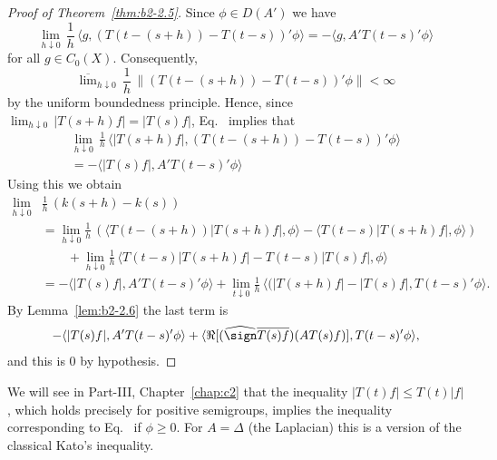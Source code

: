 \begin{proof}[Proof of Theorem~\ref{thm:b2-2.5}]
Since $\phi \in D(A')$ we have
\begin{equation}\label{eq:b2-2.14}
\lim_{h \downarrow 0}\, \frac{1}{h}\, \langle g,(T(t-(s+h)) - T(t-s))'\phi \rangle = - \langle g,A'T(t-s)'\phi \rangle
\end{equation}
for all $g \in C_{0}(X)$.
Consequently,
\begin{equation*}
\overline{\lim}_{h \downarrow 0}\, \frac{1}{h}\, \|(T(t-(s+h)) - T(t-s))'\phi\| < \infty
\end{equation*}
by the uniform boundedness principle.
Hence, since $\lim_{h \downarrow 0}\, |T(s+h)f| = |T(s)f|$, Eq.~ implies that
\begin{equation}\label{eq:b2-2.15}
\begin{split}
\lim_{h \downarrow 0}\, \frac{1}{h}\, \langle |T(s+h)f|,(T(t-(s+h)) - T(t-s))'\phi \rangle \\
= - \langle |T(s)f|,A'T(t-s)'\phi \rangle
\end{split}
\end{equation}
Using this we obtain
\begin{align*}
\lim_{h \downarrow 0} & \frac{1}{h}\, (k(s+h) - k(s)) \\
&= \lim_{h \downarrow 0}  \frac{1}{h}\, (\langle T(t-(s+h))|T(s+h)f|,\phi \rangle - \langle T(t-s)|T(s+h)f|,\phi \rangle) \\
&\qquad + \lim_{h \downarrow 0}  \frac{1}{h}\, \langle T(t-s)|T(s+h)f| - T(t-s)|T(s)f|,\phi \rangle \\
&= -\langle |T(s)f|,A'T(t-s)'\phi \rangle + \lim_{t \downarrow 0}  \frac{1}{h} \, \langle (|T(s+h)f| -  |T(s)f| , T(t-s)'\phi \rangle .
\end{align*}
By Lemma~\ref{lem:b2-2.6} the last term is
\begin{align*}
- \langle |T(s)f|,A'T(t-s)'\phi \rangle + \langle \Re[(\widehat{\sign} \overline{T(s)f})(AT(s)f)],T(t-s)'\phi \rangle,
\end{align*}
and this is $0$ by hypothesis.
\end{proof}
\begin{remark}\label{rem:b2-2.7}
We will see in Part-III, Chapter~\ref{chap:c2} that the inequality $|T(t)f| \leq T(t)|f|$, which holds precisely for positive semigroups, implies the inequality corresponding to Eq.~
if\/ $\phi \geq 0$.
For $A = \Delta$ (the Laplacian) this is a version of the classical Kato's inequality.
\end{remark}
